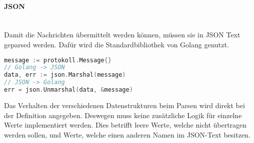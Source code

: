 \documentclass[./einleitung.tex]{subfiles}
\begin{document}
    \paragraph{JSON}\mbox{}\\
    Damit die Nachrichten übermittelt werden können, müssen sie in JSON Text geparsed werden.
    Dafür wird die Standardbibliothek von Golang genutzt.
    \begin{lstlisting}[language=Go, caption=Umwandlung von und zu JSON, label=lst:json]
message := protokoll.Message{}
// Golang -> JSON
data, err := json.Marshal(message)
// JSON -> Golang
err = json.Unmarshal(data, &message)
    \end{lstlisting}
    Das Verhalten der verschiedenen Datenstrukturen beim Parsen wird direkt bei der Definition angegeben.
    Deswegen muss keine zusätzliche Logik für einzelne Werte implementiert werden.
    Dies betrifft leere Werte, welche nicht übertragen werden sollen, und Werte, welche einen anderen Namen im JSON-Text besitzen.
\end{document}
